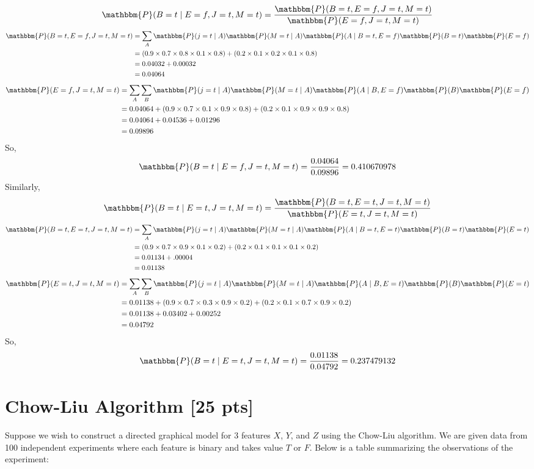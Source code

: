 \documentclass[a4paper]{article}
\theoremstyle{definition}
\newcommand{\Pbbm}{\mathbbm{P}}
\newenvironment{soln}{
	\leavevmode\color{blue}\ignorespaces
}{}
\begin{document}
\begin{soln}
	$$\Pbbm(B=t \mid E=f,J=t,M=t) = \frac{\Pbbm(B=t, E=f,J=t,M=t)}{\Pbbm(E=f,J=t,M=t)}$$
	$$ \begin{aligned}
		\Pbbm(B=t, E=f,J=t,M=t) & = \sum_A \Pbbm(j=t \mid A) \Pbbm(M=t \mid A) \Pbbm(A \mid B=t, E=f) \Pbbm(B=t) \Pbbm(E=f) \\
		& = (0.9 \times 0.7 \times 0.8 \times 0.1 \times 0.8) + (0.2 \times 0.1 \times 0.2 \times 0.1 \times 0.8) \\
		& = 0.04032 + 0.00032 \\
		& = 0.04064
	\end{aligned} $$
	$$ \begin{aligned}
		\Pbbm(E=f,J=t,M=t) & = \sum_{A} \sum_{B} \Pbbm(j=t \mid A) \Pbbm(M=t \mid A) \Pbbm(A \mid B, E=f) \Pbbm(B) \Pbbm(E=f) \\
		& = 0.04064 + (0.9 \times 0.7 \times 0.1 \times 0.9 \times 0.8) + (0.2 \times 0.1 \times 0.9 \times 0.9 \times 0.8) \\
		& = 0.04064 + 0.04536 + 0.01296 \\
		& = 0.09896
	\end{aligned} $$
	So, $$\Pbbm(B=t \mid E=f,J=t,M=t) = \frac{0.04064}{0.09896} = 0.410670978$$
	Similarly, $$\Pbbm(B=t \mid E=t,J=t,M=t) = \frac{\Pbbm(B=t, E=t,J=t,M=t)}{\Pbbm(E=t,J=t,M=t)}$$
	$$ \begin{aligned}
		\Pbbm(B=t, E=t,J=t,M=t) & = \sum_A \Pbbm(j=t \mid A) \Pbbm(M=t \mid A) \Pbbm(A \mid B=t, E=t) \Pbbm(B=t) \Pbbm(E=t) \\
		& = (0.9 \times 0.7 \times 0.9 \times 0.1 \times 0.2) + (0.2 \times 0.1 \times 0.1 \times 0.1 \times 0.2) \\
		& = 0.01134 + .00004 \\
		& = 0.01138
	\end{aligned} $$
	$$ \begin{aligned}
		\Pbbm(E=t,J=t,M=t) & = \sum_{A} \sum_{B} \Pbbm(j=t \mid A) \Pbbm(M=t \mid A) \Pbbm(A \mid B, E=t) \Pbbm(B) \Pbbm(E=t) \\
		& = 0.01138 + (0.9 \times 0.7 \times 0.3 \times 0.9 \times 0.2) + (0.2 \times 0.1 \times 0.7 \times 0.9 \times 0.2) \\
		& = 0.01138 + 0.03402 + 0.00252\\
		& = 0.04792
	\end{aligned} $$
	So, $$\Pbbm(B=t \mid E=t,J=t,M=t) = \frac{0.01138}{0.04792} = 0.237479132$$
\end{soln}


\section{Chow-Liu Algorithm [25 pts]}
Suppose we wish to construct a directed graphical model for 3 features $X$, $Y$, and $Z$ using the Chow-Liu algorithm. We are given data from 100 independent experiments where each feature is binary and takes value $T$ or $F$. Below is a table summarizing the observations of the experiment:
\end{document}
